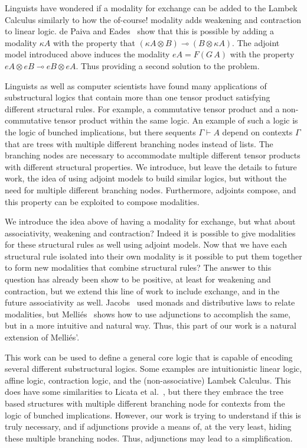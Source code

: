 Linguists \cite{?} have wondered if a modality for exchange can be
added to the Lambek Calculus similarly to how the of-course! modality
adds weakening and contraction to linear logic.  de Paiva and
Eades~\cite{?} show that this is possible by adding a modality $\kappa
A$ with the property that $(\kappa A \otimes B) \multimap (B \otimes
\kappa A)$.  The adjoint model introduced above induces the modality
$eA = F(G\,A)$ with the property $eA \otimes eB \multimap eB \otimes
eA$.  Thus providing a second solution to the problem.

Linguists as well as computer scientists have found many applications
of substructural logics that contain more than one tensor product
satisfying different structural rules.  For example, a commutative
tensor product and a non-commutative tensor product within the same
logic.  An example of such a logic is the logic of bunched
implications, but there sequents $\Gamma \vdash A$ depend on contexts
$\Gamma$ that are trees with multiple different branching nodes
instead of lists.  The branching nodes are necessary to accommodate
multiple different tensor products with different structural
properties.  We introduce, but leave the details to future work, the
idea of using adjoint models to build similar logics, but without the
need for multiple different branching nodes.  Furthermore, adjoints
compose, and this property can be exploited to compose modalities.

We introduce the idea above of having a modality for exchange, but
what about associativity, weakening and contraction?  Indeed it is
possible to give modalities for these structural rules as well using
adjoint models.  Now that we have each structural rule isolated into
their own modality is it possible to put them together to form new
modalities that combine structural rules?  The answer to this question
has already been show to be positive, at least for weakening and
contraction, but we extend this line of work to include exchange, and
in the future associativity as well.  Jacobs~\cite{JACOBS199473} used
monads and distributive laws to relate modalities, but
Melli{\'e}s~\cite{Mellies:2004} shows how to use adjunctions to
accomplish the same, but in a more intuitive and natural way.  Thus,
this part of our work is a natural extension of Melli{\'e}s'.

This work can be used to define a general core logic that is capable
of encoding several different substructural logics.  Some examples are
intuitionistic linear logic, affine logic, contraction logic, and the
(non-associative) Lambek Calculus.  This does have some similarities
to Licata et al.~\cite{licata2017fibrational}, but there they embrace
the tree based structures with multiple different branching node for
contexts from the logic of bunched implications.  However, our work is
trying to understand if this is truly necessary, and if adjunctions
provide a means of, at the very least, hiding these multiple branching
nodes.  Thus, adjunctions may lead to a simplification.

